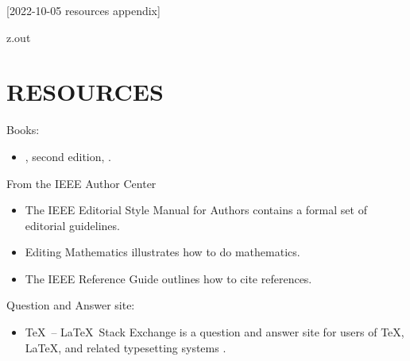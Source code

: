 [2022-10-05 resources appendix]

\begin{VerbatimOut}{z.out}
\chapter{RESOURCES}

Books:
\begin{itemize}
  \item
  , second edition, \cite{kottwitz2021}.
\end{itemize}
  
\noindent
From the
IEEE Author Center
\cite{ieee-author-center}
\begin{itemize}
  \item
    The
    IEEE Editorial Style Manual for Authors
    \cite{ieee-editorial-style-manual-for-authors}
    contains a formal set of editorial guidelines.
  \item
    Editing Mathematics
    \cite{editing-mathematics}
    illustrates how to do mathematics.
  \item
    The
    IEEE Reference Guide
    \cite{ieee-reference-guide}
    outlines how to cite references.
\end{itemize}

\noindent
Question and Answer site:
\begin{itemize}
  \item
    \TeX\ -- \LaTeX\ Stack Exchange
    is a question and answer site
    for users of
    \TeX,
    \LaTeX,
    and related typesetting systems
    \cite{tex-stackexchange}.
\end{itemize}
\end{VerbatimOut}

\MyIO
